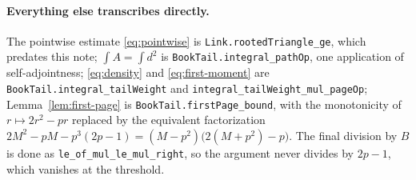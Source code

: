 \documentclass[11pt]{article}
\begin{document}
\paragraph{Everything else transcribes directly.}
The pointwise estimate \eqref{eq:pointwise} is \texttt{Link.rootedTriangle\_ge},
which predates this note; $\int A=\int d^2$ is
\texttt{BookTail.integral\_pathOp}, one application of self-adjointness;
\eqref{eq:density} and \eqref{eq:first-moment} are
\texttt{BookTail.integral\_tailWeight} and
\texttt{integral\_tailWeight\_mul\_pageOp}; Lemma~\ref{lem:first-page} is
\texttt{BookTail.firstPage\_bound}, with the monotonicity of
$r\mapsto2r^2-pr$ replaced by the equivalent factorization
$2M^2-pM-p^3(2p-1)=(M-p^2)\bigl(2(M+p^2)-p\bigr)$.  The final division by $B$
is done as \texttt{le\_of\_mul\_le\_mul\_right}, so the argument never divides
by $2p-1$, which vanishes at the threshold.
\end{document}
